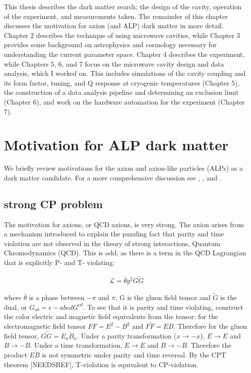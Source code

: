 \documentclass[12pt,twosides]{book}
\begin{document}
This thesis describes the dark matter search; the design of the cavity, operation of the experiment, and measurements taken. The remainder of this chapter discusses the motivation for axion (and ALP) dark matter in more detail. Chapter 2 describes the technique of using microwave cavities, while Chapter 3 provides some background on astrophysics and cosmology necessary for understanding the current parameter space. Chapter 4 describes the experiment, while Chapters 5, 6, and 7 focus on the microwave cavity design and data analysis, which I worked on. This includes simulations of the cavity coupling and its form factor, tuning, and Q response at cryogenic temperatures (Chapter 5), the construction of a data analysis pipeline and determining an exclusion limit (Chapter 6), and work on the hardware automation for the experiment (Chapter 7).

\section{Motivation for ALP dark matter}

We briefly review motivations for the axion and axion-like particles (ALPs) as a dark matter candidate. For a more comprehensive discussion see \cite{hewett12}, \cite{arias12}, and \cite{kim87}. 

\subsection{strong CP problem}

The motivation for axions, or QCD axions, is very strong. The axion arises from a mechanism introduced to explain the puzzling fact that parity and time violation are not observed in the theory of strong interactions, Quantum Chromodynamics (QCD). This is odd, as there is a term in the QCD Lagrangian that is explicitly P- and T- violating:

\begin{align*}
\mathcal{L} = \bar \theta g^2 G \tilde G
\end{align*}

where $\bar \theta$ is a phase between $-\pi$ and $\pi$, G is the gluon field tensor and $\tilde G$ is the dual, or $G_{ab} = \epsilon-{abcd} G^{cd}$. To see that it is parity and time violating, construct the color electric and magnetic field equivalents from the tensor: for the electromagnetic field tensor $FF = E^2 -B^2$ and $F\tilde F = E\dot B$. Therefore for the gluon field tensor, $G\tilde G = E_a \dot B_a$. Under a parity transformation ($x \rightarrow -x$), $E \rightarrow E$ and $B \rightarrow -B$. Under a time transformation, $
E \rightarrow E$ and $B \rightarrow -B$.  Therefore the product $E\dot B$ is not symmetric under parity and time reversal. By the CPT theorem [NEEDSREF], T-violation is equivalent to CP-violation.
\end{document}
